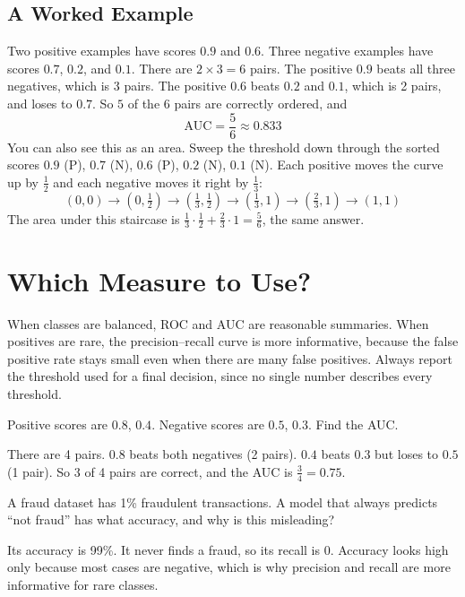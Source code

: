 \subsection{A Worked Example}
Two positive examples have scores $0.9$ and $0.6$. Three negative examples have scores $0.7$, $0.2$, and $0.1$.
There are $2 \times 3 = 6$ pairs. The positive $0.9$ beats all three negatives, which is 3 pairs. The positive $0.6$
beats $0.2$ and $0.1$, which is 2 pairs, and loses to $0.7$. So $5$ of the $6$ pairs are correctly ordered, and
$$\text{AUC} = \frac{5}{6} \approx 0.833$$
You can also see this as an area. Sweep the threshold down through the sorted
scores $0.9$ (P), $0.7$ (N), $0.6$ (P), $0.2$ (N), $0.1$ (N). Each positive moves
the curve up by $\frac{1}{2}$ and each negative moves it right by $\frac{1}{3}$:
$$(0,0) \to (0, \tfrac{1}{2}) \to (\tfrac{1}{3}, \tfrac{1}{2}) \to (\tfrac{1}{3}, 1) \to (\tfrac{2}{3}, 1) \to (1, 1)$$
The area under this staircase is $\frac{1}{3}\cdot\frac{1}{2} + \frac{2}{3}\cdot 1 = \frac{5}{6}$, the same answer.

\section{Which Measure to Use?}
When classes are balanced, ROC and AUC are reasonable summaries. When positives are rare, the precision--recall
curve is more informative, because the false positive rate stays small even when there are many false positives.
Always report the threshold used for a final decision, since no single number describes every threshold.

\begin{Exercise}[label=prc1, title=Compute the AUC]
Positive scores are $0.8$, $0.4$. Negative scores are $0.5$, $0.3$. Find the AUC.
\end{Exercise}
\begin{Answer}[ref=prc1]
There are 4 pairs. $0.8$ beats both negatives (2 pairs). $0.4$ beats $0.3$ but loses to $0.5$ (1 pair).
So 3 of 4 pairs are correct, and the AUC is $\frac{3}{4} = 0.75$.
\end{Answer}

\begin{Exercise}[label=prc2, title=Rare positives]
A fraud dataset has 1\% fraudulent transactions. A model that always predicts ``not fraud'' has what accuracy, and why is this misleading?
\end{Exercise}
\begin{Answer}[ref=prc2]
Its accuracy is 99\%. It never finds a fraud, so its recall is 0. Accuracy looks high only because most cases are
negative, which is why precision and recall are more informative for rare classes.
\end{Answer}
